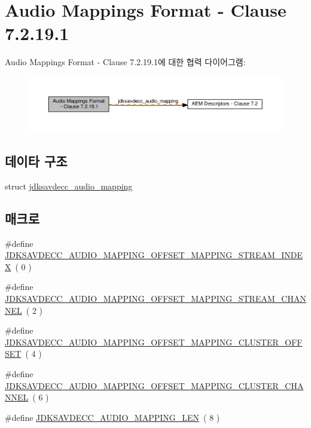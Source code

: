 \hypertarget{group__audio__mapping}{}\section{Audio Mappings Format -\/ Clause 7.2.19.1}
\label{group__audio__mapping}
Audio Mappings Format -\/ Clause 7.2.19.1에 대한 협력 다이어그램\+:
\nopagebreak
\begin{figure}[H]
\begin{center}
\leavevmode
\includegraphics[width=350pt]{group__audio__mapping}
\end{center}
\end{figure}
\subsection*{데이타 구조}
\begin{DoxyCompactItemize}
\item 
struct \hyperlink{structjdksavdecc__audio__mapping}{jdksavdecc\+\_\+audio\+\_\+mapping}
\end{DoxyCompactItemize}
\subsection*{매크로}
\begin{DoxyCompactItemize}
\item 
\#define \hyperlink{group__audio__mapping_gaff17abcbae620dedc2c0f683b6148b8f}{J\+D\+K\+S\+A\+V\+D\+E\+C\+C\+\_\+\+A\+U\+D\+I\+O\+\_\+\+M\+A\+P\+P\+I\+N\+G\+\_\+\+O\+F\+F\+S\+E\+T\+\_\+\+M\+A\+P\+P\+I\+N\+G\+\_\+\+S\+T\+R\+E\+A\+M\+\_\+\+I\+N\+D\+EX}~( 0 )
\item 
\#define \hyperlink{group__audio__mapping_ga2b4b83a34d5baf5fd8eeaffc6eebbb30}{J\+D\+K\+S\+A\+V\+D\+E\+C\+C\+\_\+\+A\+U\+D\+I\+O\+\_\+\+M\+A\+P\+P\+I\+N\+G\+\_\+\+O\+F\+F\+S\+E\+T\+\_\+\+M\+A\+P\+P\+I\+N\+G\+\_\+\+S\+T\+R\+E\+A\+M\+\_\+\+C\+H\+A\+N\+N\+EL}~( 2 )
\item 
\#define \hyperlink{group__audio__mapping_ga174ac05daccbcd25f401eac241ad6667}{J\+D\+K\+S\+A\+V\+D\+E\+C\+C\+\_\+\+A\+U\+D\+I\+O\+\_\+\+M\+A\+P\+P\+I\+N\+G\+\_\+\+O\+F\+F\+S\+E\+T\+\_\+\+M\+A\+P\+P\+I\+N\+G\+\_\+\+C\+L\+U\+S\+T\+E\+R\+\_\+\+O\+F\+F\+S\+ET}~( 4 )
\item 
\#define \hyperlink{group__audio__mapping_ga625a930d4963bce1d448347efdd150ce}{J\+D\+K\+S\+A\+V\+D\+E\+C\+C\+\_\+\+A\+U\+D\+I\+O\+\_\+\+M\+A\+P\+P\+I\+N\+G\+\_\+\+O\+F\+F\+S\+E\+T\+\_\+\+M\+A\+P\+P\+I\+N\+G\+\_\+\+C\+L\+U\+S\+T\+E\+R\+\_\+\+C\+H\+A\+N\+N\+EL}~( 6 )
\item 
\#define \hyperlink{group__audio__mapping_ga0dd006bf2320b99909db301f043f0cae}{J\+D\+K\+S\+A\+V\+D\+E\+C\+C\+\_\+\+A\+U\+D\+I\+O\+\_\+\+M\+A\+P\+P\+I\+N\+G\+\_\+\+L\+EN}~( 8 )
\end{DoxyCompactItemize}
